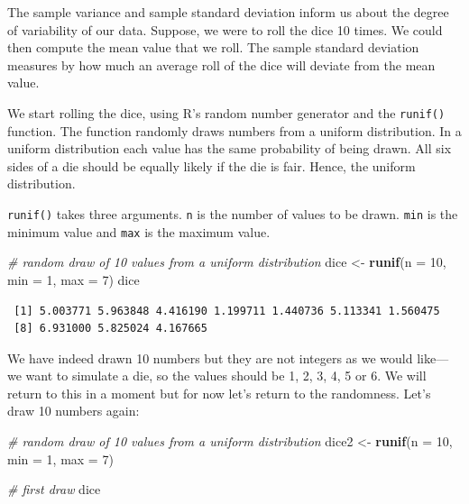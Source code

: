 \documentclass[]{article}
\newenvironment{Shaded}{\begin{snugshade}}{\end{snugshade}}
\newcommand{\CommentTok}[1]{\textcolor[rgb]{0.56,0.35,0.01}{\textit{#1}}}
\newcommand{\DataTypeTok}[1]{\textcolor[rgb]{0.13,0.29,0.53}{#1}}
\newcommand{\DecValTok}[1]{\textcolor[rgb]{0.00,0.00,0.81}{#1}}
\newcommand{\KeywordTok}[1]{\textcolor[rgb]{0.13,0.29,0.53}{\textbf{#1}}}
\newcommand{\NormalTok}[1]{#1}
\newcommand{\StringTok}[1]{\textcolor[rgb]{0.31,0.60,0.02}{#1}}
\begin{document}
The sample variance and sample standard deviation inform us about the degree of variability of our data. Suppose, we were to roll the dice 10 times. We could then compute the mean value that we roll. The sample standard deviation measures by how much an average roll of the dice will deviate from the mean value.

We start rolling the dice, using R's random number generator and the \texttt{runif()} function. The function randomly draws numbers from a uniform distribution. In a uniform distribution each value has the same probability of being drawn. All six sides of a die should be equally likely if the die is fair. Hence, the uniform distribution.

\texttt{runif()} takes three arguments. \texttt{n} is the number of values to be drawn. \texttt{min} is the minimum value and \texttt{max} is the maximum value.

\begin{Shaded}
\begin{Highlighting}[]
\CommentTok{# random draw of 10 values from a uniform distribution}
\NormalTok{dice <-}\StringTok{ }\KeywordTok{runif}\NormalTok{(}\DataTypeTok{n =} \DecValTok{10}\NormalTok{, }\DataTypeTok{min =} \DecValTok{1}\NormalTok{, }\DataTypeTok{max =} \DecValTok{7}\NormalTok{)}
\NormalTok{dice}
\end{Highlighting}
\end{Shaded}

\begin{verbatim}
 [1] 5.003771 5.963848 4.416190 1.199711 1.440736 5.113341 1.560475
 [8] 6.931000 5.825024 4.167665
\end{verbatim}

We have indeed drawn 10 numbers but they are not integers as we would like---we want to simulate a die, so the values should be 1, 2, 3, 4, 5 or 6. We will return to this in a moment but for now let's return to the randomness. Let's draw 10 numbers again:

\begin{Shaded}
\begin{Highlighting}[]
\CommentTok{# random draw of 10 values from a uniform distribution}
\NormalTok{dice2 <-}\StringTok{ }\KeywordTok{runif}\NormalTok{(}\DataTypeTok{n =} \DecValTok{10}\NormalTok{, }\DataTypeTok{min =} \DecValTok{1}\NormalTok{, }\DataTypeTok{max =} \DecValTok{7}\NormalTok{)}

\CommentTok{# first draw}
\NormalTok{dice}
\end{Highlighting}
\end{Shaded}
\end{document}
